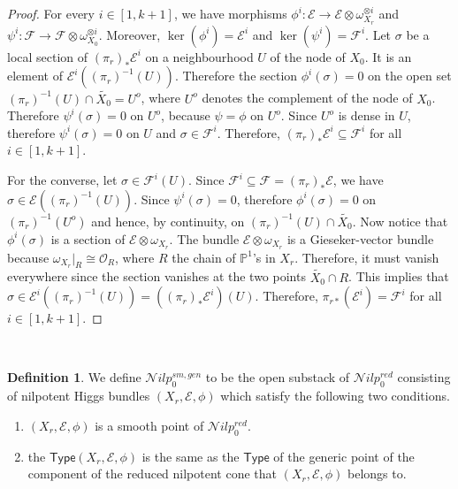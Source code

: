 \documentclass[11pt]{amsart}
\newcommand {\Type} {\textsf{Type}}
\theoremstyle{plain}
\numberwithin{equation}{section}
\theoremstyle{definition}
\newtheorem{Def}{Definition}[section]
\theoremstyle{plain}
\begin{document}
\begin{proof}
    For every $i\in [1,k+1]$, we have morphisms $\phi^i: \mathcal E\longrightarrow \mathcal E\otimes \omega^{\otimes i}_{X_r}$ and $\psi^i: \mathcal F\longrightarrow \mathcal F\otimes \omega^{\otimes i}_{X_0}$. Moreover, $\ker(\phi^i)=\mathcal E^i$ and $\ker(\psi^i)=\mathcal F^i$. Let $\sigma$ be a local section of $(\pi_r)_*\mathcal E^i$ on a neighbourhood $U$ of the node of $X_0$. It is an element of $\mathcal E^i((\pi_r)^{-1}(U))$. Therefore the section $\phi^i(\sigma)=0$ on the open set $(\pi_r)^{-1}(U)\cap \tilde{X_0}=U^o$, where $U^o$ denotes the complement of the node of $X_0$. Therefore $\psi^i(\sigma)=0$ on $U^o$, because $\psi=\phi$ on $U^o$. Since $U^o$ is dense in $U$, therefore $\psi^i(\sigma)=0$ on $U$ and $\sigma\in \mathcal F^i$. Therefore, $(\pi_r)_*\mathcal E^i\subseteq \mathcal F^i$ for all $i\in [1,k+1]$.

    For the converse, let $\sigma\in \mathcal F^i(U)$. Since $\mathcal F^i\subseteq \mathcal F=(\pi_r)_*\mathcal E$, we have $\sigma \in \mathcal E((\pi_r)^{-1}(U))$. Since $\psi^i(\sigma)=0$, therefore $\phi^i(\sigma)=0$ on  $(\pi_r)^{-1}(U^o)$ and hence, by continuity, on $(\pi_r)^{-1}(U)\cap \widetilde{X_0}$. Now notice that $\phi^i(\sigma)$ is a section of $\mathcal E\otimes \omega_{X_r}$. The bundle $\mathcal E\otimes \omega_{X_r}$ is a Gieseker-vector bundle because $\omega_{X_r}|_R\cong \mathcal O_R$, where $R$ the chain of $\mathbb P^1$'s in $X_r$. Therefore, it must vanish everywhere since the section vanishes at the two points $\widetilde{X_0}\cap R$. This implies that $\sigma\in \mathcal E^i((\pi_r)^{-1}(U))=((\pi_r)_*\mathcal E^i)(U)$. Therefore, $\pi_{r*}(\mathcal E^i)=\mathcal F^i$ for all $i\in [1,k+1]$.   
\end{proof}

\

\begin{Def}
We define $\mathcal Nilp^{sm, gen}_0$ to be the open substack of $\mathcal Nilp^{red}_0$ consisting of nilpotent Higgs bundles $(X_r, \mathcal E, \phi)$ which satisfy the following two conditions.
\begin{enumerate}
    \item $(X_r, \mathcal E, \phi)$ is a smooth point of $\mathcal Nilp^{red}_0$. 
    \item the $\Type(X_r, \mathcal E, \phi)$ is the same as the $\Type$ of the generic point of the component of the reduced nilpotent cone that $(X_r, \mathcal E, \phi)$ belongs to. 
\end{enumerate}
\end{Def}
\end{document}
